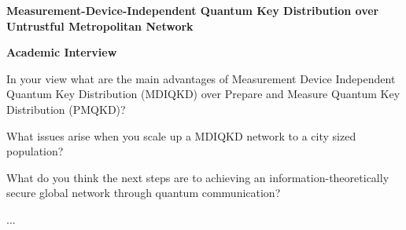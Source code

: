 \documentclass{exam}
\begin{document}
\begin{EnvFullwidth}
\Large \centering \textbf{Measurement-Device-Independent Quantum Key Distribution over Untrustful
Metropolitan Network}
\end{EnvFullwidth}

\begin{EnvFullwidth}
\centering \textbf{Academic Interview}
\end{EnvFullwidth}

\begin{questions}
\question
In your view what are the main advantages of Measurement Device Independent Quantum Key Distribution (MDIQKD) over Prepare and Measure Quantum Key Distribution (PMQKD)?
\fillwithlines{1in}

\question
What issues arise when you scale up a MDIQKD network to a city sized population? 
\fillwithlines{1in}

\question
What do you think the next steps are to achieving an information-theoretically secure global network through quantum communication? 
\fillwithlines{1in}

\question
...
\fillwithlines{1in}
\end{questions}
\end{document}
